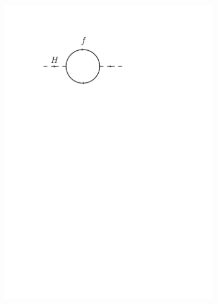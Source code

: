 \begin{figure}[!t]
  \centering
   \begin{subfigure}{0.49\textwidth}
      \includegraphics[width=\textwidth]{Theory/FeynmanGraphs/loopFermion.pdf}
     \caption{}
      \label{fig:loopFermion}
 \end{subfigure}
   \begin{subfigure}{0.49\textwidth}

\end{subfigure}
\end{figure}
